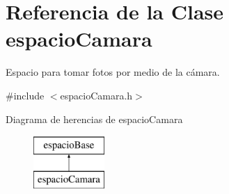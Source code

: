 \hypertarget{classespacio_camara}{}\section{Referencia de la Clase espacio\+Camara}
\label{classespacio_camara}


Espacio para tomar fotos por medio de la cámara.  




{\ttfamily \#include $<$espacio\+Camara.\+h$>$}

Diagrama de herencias de espacio\+Camara\begin{figure}[H]
\begin{center}
\leavevmode
\includegraphics[height=2.000000cm]{classespacio_camara}
\end{center}
\end{figure}
